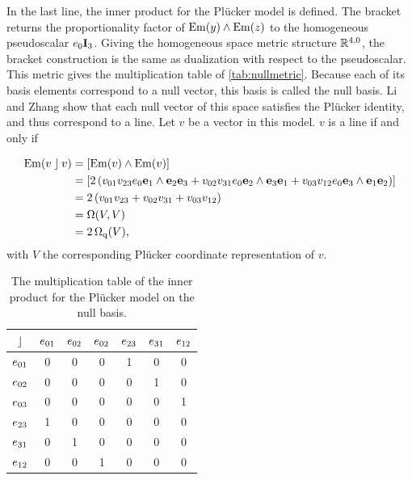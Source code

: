 In the last line, the inner product for the Pl\"ucker model is defined.  The bracket returns the proportionality factor of $\operatorname{Em}(y) \wedge \operatorname{Em}(z)$ to the homogeneous pseudoscalar $e_0\mathbf{I}_3$.  Giving the homogeneous space metric structure $\mathbb{R}^{4,0}$, the bracket construction is the same as dualization with respect to the pseudoscalar.  This metric gives the multiplication table of \autoref{tab:nullmetric}.  Because each of its basis elements correspond to a null vector, this basis is called the null basis.  Li and Zhang show that each null vector of this space satisfies the Pl\"ucker identity, and thus correspond to a line.  Let $v$ be a vector in this model.  $v$ is a line if and only if

\begin{align*}
  \operatorname{Em}(v \mathbin{\rfloor} v) &= \left[\operatorname{Em}(v) \wedge \operatorname{Em}(v)\right] \\
    &= \left[ 2 \left( v_{01} v_{23} e_0\mathbf{e}_1 \wedge \mathbf{e}_2\mathbf{e}_3 + v_{02} v_{31} e_0\mathbf{e}_2 \wedge \mathbf{e}_3\mathbf{e}_1 + v_{03} v_{12} e_0\mathbf{e}_3 \wedge \mathbf{e}_1\mathbf{e}_2 \right) \right] \\
    &= 2 \left( v_{01} v_{23} + v_{02} v_{31} + v_{03} v_{12} \right) \\
    &= \operatorname{\Omega}(V, V) \\
    &= 2 \operatorname{\Omega_q}(V),
\end{align*}
with $V$ the corresponding Pl\"ucker coordinate representation of $v$.

\begin{table}
  \caption{The multiplication table of the inner product for the Pl\"ucker model on the null basis.}
  \label{tab:nullmetric}
  \begin{center}
    \begin{tabular}{|c||c|c|c|c|c|c|}
      \hline
      $\mathbin{\rfloor}$ & $e_{01}$ & $e_{02}$ & $e_{02}$ & $e_{23}$ & $e_{31}$ & $e_{12}$ \\
      \hline \hline
      $e_{01}$ & 0 & 0 & 0 & 1 & 0 & 0 \\
      \hline
      $e_{02}$ & 0 & 0 & 0 & 0 & 1 & 0 \\
      \hline
      $e_{03}$ & 0 & 0 & 0 & 0 & 0 & 1 \\
      \hline
      $e_{23}$ & 1 & 0 & 0 & 0 & 0 & 0 \\
      \hline
      $e_{31}$ & 0 & 1 & 0 & 0 & 0 & 0 \\
      \hline
      $e_{12}$ & 0 & 0 & 1 & 0 & 0 & 0 \\
      \hline
    \end{tabular}
  \end{center}
\end{table}

